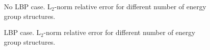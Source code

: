 \documentclass[11pt,letterpaper]{article}
\begin{document}
\begin{figure}[htbp!]
	\centering
	\hfill
    \caption{No LBP case. L$_2$-norm relative error for different number of energy group structures.}
	\label{fig:assembly-noLBP-er}
\end{figure}

\begin{figure}[htbp!]
	\centering
	\hfill
    \caption{LBP case. L$_2$-norm relative error for different number of energy group structures.}
	\label{fig:assembly-LBP-er}
\end{figure}
\end{document}
